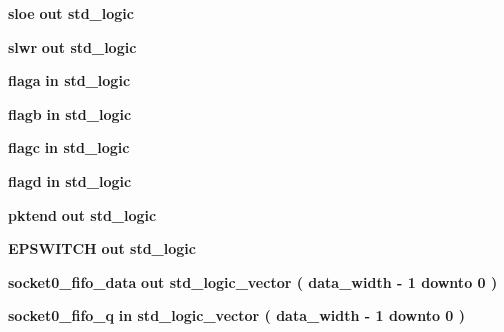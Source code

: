 \begin{DoxyCompactItemize}
\item 
{\bf sloe}  {\bfseries {\bfseries \textcolor{keywordflow}{out}\textcolor{vhdlchar}{ }}} {\bfseries \textcolor{comment}{std\+\_\+logic}\textcolor{vhdlchar}{ }} 
\item 
{\bf slwr}  {\bfseries {\bfseries \textcolor{keywordflow}{out}\textcolor{vhdlchar}{ }}} {\bfseries \textcolor{comment}{std\+\_\+logic}\textcolor{vhdlchar}{ }} 
\item 
{\bf flaga}  {\bfseries {\bfseries \textcolor{keywordflow}{in}\textcolor{vhdlchar}{ }}} {\bfseries \textcolor{comment}{std\+\_\+logic}\textcolor{vhdlchar}{ }} 
\item 
{\bf flagb}  {\bfseries {\bfseries \textcolor{keywordflow}{in}\textcolor{vhdlchar}{ }}} {\bfseries \textcolor{comment}{std\+\_\+logic}\textcolor{vhdlchar}{ }} 
\item 
{\bf flagc}  {\bfseries {\bfseries \textcolor{keywordflow}{in}\textcolor{vhdlchar}{ }}} {\bfseries \textcolor{comment}{std\+\_\+logic}\textcolor{vhdlchar}{ }} 
\item 
{\bf flagd}  {\bfseries {\bfseries \textcolor{keywordflow}{in}\textcolor{vhdlchar}{ }}} {\bfseries \textcolor{comment}{std\+\_\+logic}\textcolor{vhdlchar}{ }} 
\item 
{\bf pktend}  {\bfseries {\bfseries \textcolor{keywordflow}{out}\textcolor{vhdlchar}{ }}} {\bfseries \textcolor{comment}{std\+\_\+logic}\textcolor{vhdlchar}{ }} 
\item 
{\bf E\+P\+S\+W\+I\+T\+CH}  {\bfseries {\bfseries \textcolor{keywordflow}{out}\textcolor{vhdlchar}{ }}} {\bfseries \textcolor{comment}{std\+\_\+logic}\textcolor{vhdlchar}{ }} 
\item 
{\bf socket0\+\_\+fifo\+\_\+data}  {\bfseries {\bfseries \textcolor{keywordflow}{out}\textcolor{vhdlchar}{ }}} {\bfseries \textcolor{comment}{std\+\_\+logic\+\_\+vector}\textcolor{vhdlchar}{ }\textcolor{vhdlchar}{(}\textcolor{vhdlchar}{ }\textcolor{vhdlchar}{ }\textcolor{vhdlchar}{ }\textcolor{vhdlchar}{ }{\bfseries {\bf data\+\_\+width}} \textcolor{vhdlchar}{-\/}\textcolor{vhdlchar}{ } \textcolor{vhdldigit}{1} \textcolor{vhdlchar}{ }\textcolor{keywordflow}{downto}\textcolor{vhdlchar}{ }\textcolor{vhdlchar}{ } \textcolor{vhdldigit}{0} \textcolor{vhdlchar}{ }\textcolor{vhdlchar}{)}\textcolor{vhdlchar}{ }} 
\item 
{\bf socket0\+\_\+fifo\+\_\+q}  {\bfseries {\bfseries \textcolor{keywordflow}{in}\textcolor{vhdlchar}{ }}} {\bfseries \textcolor{comment}{std\+\_\+logic\+\_\+vector}\textcolor{vhdlchar}{ }\textcolor{vhdlchar}{(}\textcolor{vhdlchar}{ }\textcolor{vhdlchar}{ }\textcolor{vhdlchar}{ }\textcolor{vhdlchar}{ }{\bfseries {\bf data\+\_\+width}} \textcolor{vhdlchar}{-\/}\textcolor{vhdlchar}{ } \textcolor{vhdldigit}{1} \textcolor{vhdlchar}{ }\textcolor{keywordflow}{downto}\textcolor{vhdlchar}{ }\textcolor{vhdlchar}{ } \textcolor{vhdldigit}{0} \textcolor{vhdlchar}{ }\textcolor{vhdlchar}{)}\textcolor{vhdlchar}{ }} 

\end{DoxyCompactItemize}
